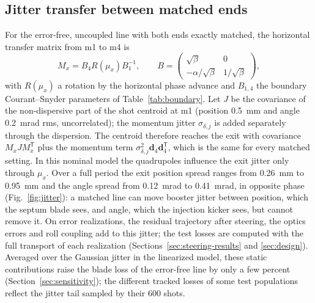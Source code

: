 \documentclass[final,5p,twocolumn]{elsarticle}
\begin{document}
\subsection{Jitter transfer between matched ends}\label{sec:jitter}
For the error-free, uncoupled line with both ends exactly matched, the horizontal
transfer matrix from m1 to m4 is
\begin{equation}
 M_x=B_4R(\mu_x)B_1^{-1},\qquad
 B=\begin{pmatrix}\sqrt\beta&0\\-\alpha/\sqrt\beta&1/\sqrt\beta\end{pmatrix},
 \label{eq:transfer}
\end{equation}
with $R(\mu_x)$ a rotation by the horizontal phase advance and $B_{1,4}$ the
boundary Courant--Snyder parameters of Table~\ref{tab:boundary}. Let $J$ be the covariance of the
non-dispersive part of the shot centroid at m1 (position \SI{0.5}{\milli\metre} and angle
\SI{0.2}{\milli\radian} rms, uncorrelated); the momentum jitter $\sigma_{\delta,j}$ is added
separately through the dispersion. The centroid therefore reaches the exit with
covariance $M_xJM_x^{\mathsf T}$ plus the momentum term $\sigma_{\delta,j}^2\mathbf d_4
\mathbf d_4^{\mathsf T}$, which is the same for every matched setting. In this
nominal model the quadrupoles influence the exit jitter only through $\mu_x$. Over a full period the
exit position spread ranges from \SI{0.26}{\milli\metre} to \SI{0.95}{\milli\metre} and the angle spread from \SI{0.12}{\milli\radian} to
\SI{0.41}{\milli\radian}, in opposite phase (Fig.~\ref{fig:jitter}): a matched line can move
booster jitter between position, which the septum blade sees, and angle, which the
injection kicker sees, but cannot remove it. On error realizations, the residual
trajectory after steering, the optics errors and roll coupling add to this jitter;
the test losses are computed with the full transport of each realization
(Sections~\ref{sec:steering-results} and \ref{sec:design}). Averaged over the Gaussian
jitter in the linearized model, these static contributions raise the blade loss of the error-free line by only
a few percent (Section~\ref{sec:sensitivity}); the different tracked losses of some test
populations reflect the jitter tail sampled by their 600 shots.
\end{document}
